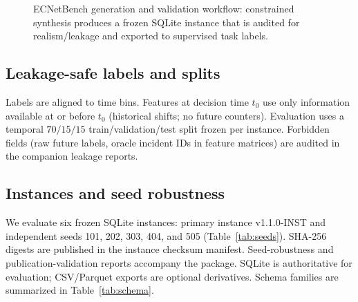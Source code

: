 \begin{figure}[!t]
\centering
{}
\caption{ECNetBench generation and validation workflow: constrained synthesis produces a frozen SQLite instance that is audited for realism/leakage and exported to supervised task labels.}
\label{fig:benchflow}
\end{figure}

\subsection{Leakage-safe labels and splits}
Labels are aligned to time bins. Features at decision time $t_0$ use only information available at or before $t_0$ (historical shifts; no future counters). Evaluation uses a temporal $70/15/15$ train/validation/test split frozen per instance. Forbidden fields (raw future labels, oracle incident IDs in feature matrices) are audited in the companion leakage reports.

\subsection{Instances and seed robustness}
We evaluate six frozen SQLite instances: primary instance v1.1.0-INST and independent seeds 101, 202, 303, 404, and 505 (Table~\ref{tab:seeds}). SHA-256 digests are published in the instance checksum manifest. Seed-robustness and publication-validation reports accompany the package. SQLite is authoritative for evaluation; CSV/Parquet exports are optional derivatives. Schema families are summarized in Table~\ref{tab:schema}.

